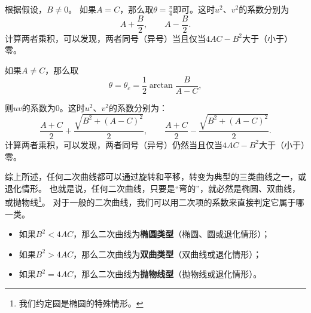 \documentclass[12pt,UTF8,fontset=none]{ctexbook}
\begin{document}
根据假设，$B\neq 0$。
如果$A = C$，那么取$\theta = \frac{\pi}{4}$即可。这时$u^2$、$v^2$的系数分别为
$$ A + \frac{B}{2}, \qquad A - \frac{B}{2}. $$
计算两者乘积，可以发现，两者同号（异号）当且仅当$4AC - B^2$大于（小于）零。

如果$A\neq C$，那么取
$$\theta = \theta_c = \frac{1}{2} \arctan{\frac{B}{A - C}},$$



则$uv$的系数为$0$。这时$u^2$、$v^2$的系数分别为：
$$ \frac{A+C}{2} + \frac{\sqrt{B^2 + (A - C)^2}}{2}, \qquad \frac{A+C}{2} - \frac{\sqrt{B^2 + (A - C)^2}}{2}. $$
计算两者乘积，可以发现，两者同号（异号）仍然当且仅当$4AC - B^2$大于（小于）零。

综上所述，任何二次曲线都可以通过旋转和平移，转变为典型的三类曲线之一，或退化情形。
也就是说，任何二次曲线，只要是“弯的”，就必然是椭圆、双曲线，或抛物线\footnote{我们约定圆是椭圆的特殊情形。}。
对于一般的二次曲线，我们可以用二次项的系数来直接判定它属于哪一类。
\begin{itemize}
    \item 如果$B^2<4AC$，那么二次曲线为\textbf{椭圆类型}（椭圆、圆或退化情形）；
    \item 如果$B^2>4AC$，那么二次曲线为\textbf{双曲类型}（双曲线或退化情形）；
    \item 如果$B^2=4AC$，那么二次曲线为\textbf{抛物线型}（抛物线或退化情形）。
\end{itemize}
\end{document}
